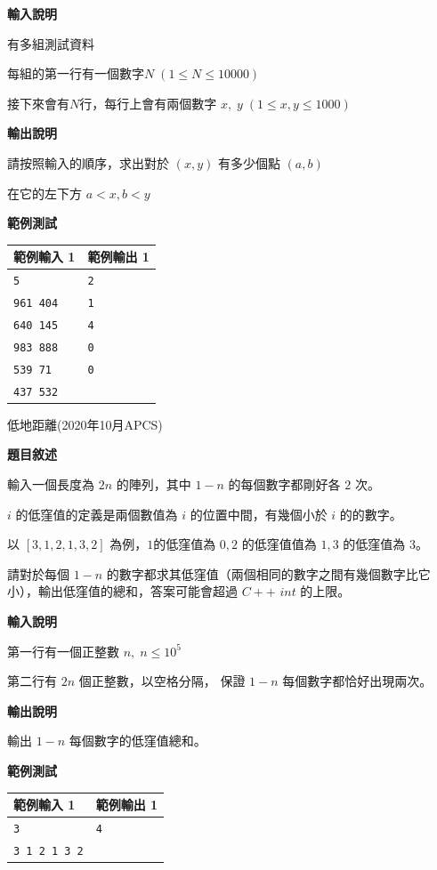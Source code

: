     \textbf{輸入說明}

    有多組測試資料

    每組的第一行有一個數字$N \; ( 1 \le N \le 10000 )$

    接下來會有$N$行，每行上會有兩個數字  $x, \; y \; ( 1 \le x , y \le 1000 )$

    \textbf{輸出說明}

    請按照輸入的順序，求出對於 $( x , y )$ 有多少個點 $( a , b )$

    在它的左下方 $a < x , b < y$

    \textbf{範例測試}

    \begin{tabular}{|m{7cm}|m{7cm}|}
        \hline
        範例輸入 1 & 範例輸出 1 \\
        \hline
        \verb|5|      & \verb|2| \\
        \verb|961 404| & \verb|1| \\
        \verb|640 145| & \verb|4| \\
        \verb|983 888| & \verb|0| \\
        \verb|539 71| & \verb|0| \\
        \verb|437 532| & \\
        \hline
    \end{tabular}

    \problem 低地距離(2020年10月APCS)

    \textbf{題目敘述}

    輸入一個長度為 $2n$ 的陣列，其中 $1 - n$ 的每個數字都剛好各 $2$ 次。

    $i$ 的低窪值的定義是兩個數值為 $i$ 的位置中間，有幾個小於 $i$ 的的數字。

    以 $[3, 1, 2, 1, 3, 2]$ 為例，$1$的低窪值為 $0, 2$ 的低窪值值為 $1, 3$ 的低窪值為 $3$。

    請對於每個 $1 - n$ 的數字都求其低窪值（兩個相同的數字之間有幾個數字比它小），輸出低窪值的總和，答案可能會超過 $C++$ $int$ 的上限。

    \textbf{輸入說明}

    第一行有一個正整數 $n, \; n \le 10^5$

    第二行有 $2n$ 個正整數，以空格分隔，
    保證 $1 - n$ 每個數字都恰好出現兩次。


    \textbf{輸出說明}

    輸出 $1 - n$ 每個數字的低窪值總和。

    \textbf{範例測試}

    \begin{tabular}{|m{7cm}|m{7cm}|}
        \hline
        範例輸入 1 & 範例輸出 1 \\
        \hline
        \verb|3|      & \verb|4| \\
        \verb|3 1 2 1 3 2| & \\
        \hline
    \end{tabular}